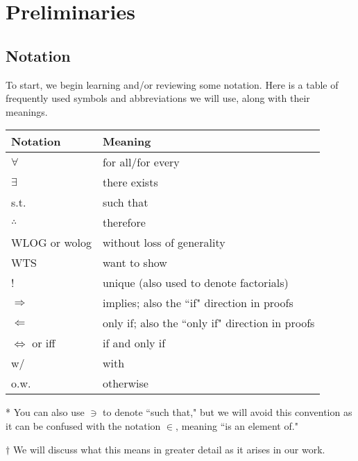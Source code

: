 \chapter{Preliminaries}\label{pre} %

\section{Notation}
To start, we begin learning and/or reviewing some notation.  Here is a table of frequently used symbols and abbreviations we will use, along with their meanings.
\begin{center}
\begin{threeparttable}
\renewcommand{\arraystretch}{1.3}
\begin{tabular}{|l|l|}
\hline
\textbf{Notation}& \textbf{Meaning}\\
\hline
$\forall$ & for all/for every\\
\hline
$\exists$ & there exists\\
\hline
s.t. & such that\tnote{*}\\
\hline
$\therefore$ & therefore\\
\hline
WLOG or wolog & without loss of generality\tnote{$\dagger$}\\
\hline
WTS & want to show\\
\hline
! & unique (also used to denote factorials)\\
\hline
$\Rightarrow$ & implies; also the ``if" direction in proofs\\
\hline
$\Leftarrow$ & only if; also the ``only if" direction in proofs \\
\hline
$\Leftrightarrow$ or iff& if and only if\\
\hline
w/ & with\\
\hline
o.w. & otherwise\\
\hline
\end{tabular}
\begin{tablenotes}
\item[*]\small You can also use $\ni$ to denote ``such that," but we will avoid this convention as it can be confused with the notation $\in$, meaning ``is an element of."
\item[$\dagger$]\small We will discuss what this means in greater detail as it arises in our work.
\end{tablenotes}
\end{threeparttable}
\end{center}

